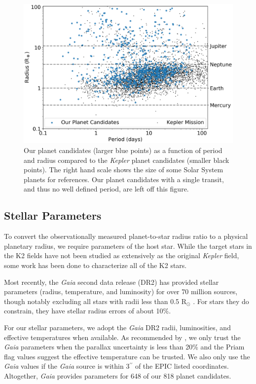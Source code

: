 \documentclass[twocolumn]{aastex62}
\newcommand{\project}[1]{\textsl{#1}}
\newcommand{\nplanet}{818}
\newcommand{\ngaia}{648}
\begin{document}
\begin{figure}[tbp]
\includegraphics[width=\textwidth]{candidate_period_rp_bw.png}
\caption{Our planet candidates (larger blue points) as a function of
  period and radius compared to the \project{Kepler} planet candidates
  (smaller black points). The right hand scale shows the size of some
  Solar System planets for references. Our planet candidates with a
  single transit, and thus no well defined period, are left off this
  figure. \label{candidateperiod}}
\end{figure}


\subsection{Stellar Parameters}
\label{stellarpars}

To convert the observationally measured planet-to-star radius ratio to
a physical planetary radius, we require parameters of the host
star. While the target stars in the K2 fields have not been studied as
extensively as the original \project{Kepler} field, some work has been
done to characterize all of the K2 stars.

Most recently, the \project{Gaia} second data release (DR2) has
provided stellar parameters (radius, temperature, and luminosity) for
over 70 million sources, though notably excluding all stars with radii
less than 0.5 R$_\odot$ \citep{gai16, gai18, and18}. For stars they do
constrain, they have stellar radius errors of about 10\%.

For our stellar parameters, we adopt the \project{Gaia} DR2 radii,
luminosities, and effective temperatures when available. As
recommended by \cite{and18}, we only trust the \project{Gaia}
parameters when the parallax uncertainty is less than 20\% and the
Priam flag values suggest the effective temperature can be trusted. We
also only use the \project{Gaia} values if the \project{Gaia} source
is within 3$^{\prime \prime}$ of the EPIC listed
coordinates. Altogether, \project{Gaia} provides parameters for
\ngaia{} of our \nplanet{} planet candidates.
\end{document}
